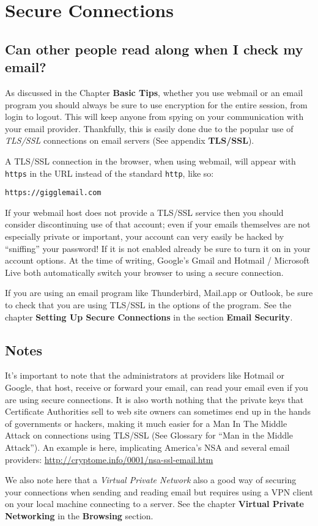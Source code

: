 \section{Secure Connections}

\subsection{Can other people read along when I check my email?}

As discussed in the Chapter \textbf{Basic Tips}, whether you use webmail
or an email program you should always be sure to use encryption for the
entire session, from login to logout. This will keep anyone from spying
on your communication with your email provider. Thankfully, this is
easily done due to the popular use of \emph{TLS/SSL} connections on
email servers (See appendix \textbf{TLS/SSL}).

A TLS/SSL connection in the browser, when using webmail, will appear
with \verb!https! in the URL instead of the standard \verb!http!, like
so:

\verb!https://gigglemail.com!

If your webmail host does not provide a TLS/SSL service then you should
consider discontinuing use of that account; even if your emails
themselves are not especially private or important, your account can
very easily be hacked by ``sniffing'' your password! If it is not
enabled already be sure to turn it on in your account options. At the
time of writing, Google's Gmail and Hotmail / Microsoft Live both
automatically switch your browser to using a secure connection.

If you are using an email program like Thunderbird, Mail.app or Outlook,
be sure to check that you are using TLS/SSL in the options of the
program. See the chapter \textbf{Setting Up Secure Connections} in the
section \textbf{Email Security}.

\subsection{Notes}

It's important to note that the administrators at providers like Hotmail
or Google, that host, receive or forward your email, can read your email
even if you are using secure connections. It is also worth nothing that
the private keys that Certificate Authorities sell to web site owners
can sometimes end up in the hands of governments or hackers, making it
much easier for a Man In The Middle Attack on connections using TLS/SSL
(See Glossary for ``Man in the Middle Attack''). An example is here,
implicating America's NSA and several email providers:
\href{http://cryptome.info/0001/nsa-ssl-email.htm}{http://cryptome.info/0001/nsa-ssl-email.htm}

We also note here that a \emph{Virtual Private Network} also a good way
of securing your connections when sending and reading email but requires
using a VPN client on your local machine connecting to a server. See the
chapter \textbf{Virtual Private Networking} in the \textbf{Browsing}
section.
